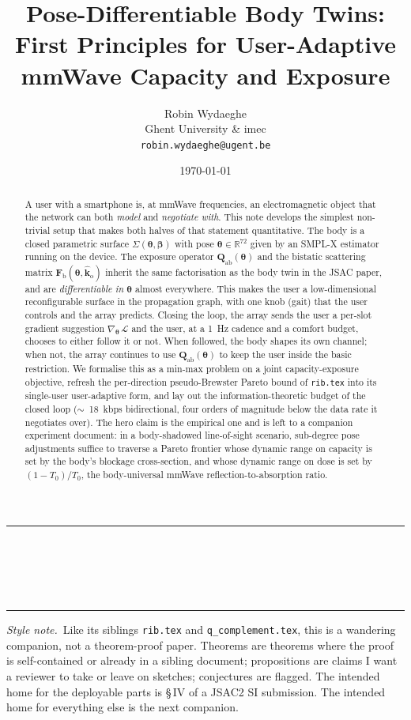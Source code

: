 \documentclass[11pt,a4paper]{article}
\title{\textbf{Pose-Differentiable Body Twins:\\
First Principles for User-Adaptive\\
mmWave Capacity and Exposure}}
\author{Robin Wydaeghe\\
 Ghent University \& imec\\
 \texttt{robin.wydaeghe@ugent.be}}
\date{\today}
\makeatletter
\theoremstyle{definition}
\newcommand{\Reals}{\mathbb{R}}
\newcommand{\Qabs}{\mathbf{Q}_{\mathrm{ab}}}
\newcommand{\kout}{\hat{\bm{k}}_{\mathrm{o}}}
\newcommand{\Frib}{\mathbf{F}_{\mathrm{b}}}
\newcommand{\thetab}{\bm{\theta}}
\newcommand{\betab}{\bm{\beta}}
\renewcommand{\maketitle}{%
  \thispagestyle{plain}%
  \begin{center}
    \rule{\linewidth}{1pt}\\[0.4em]
    {\LARGE\bfseries \@title}\\[0.5em]
    {\large \@author}\\[0.3em]
    {\small \@date}\\[0.4em]\rule{\linewidth}{1pt}
  \end{center}
  \vspace{0.5em}
}
\makeatother
\begin{document}
\maketitle

\begin{abstract}
A user with a smartphone is, at mmWave frequencies, an electromagnetic
object that the network can both \emph{model} and \emph{negotiate
with}.  This note develops the simplest non-trivial setup that makes
both halves of that statement quantitative.  The body is a closed
parametric surface $\Sigma(\thetab,\betab)$ with pose
$\thetab\in\Reals^{72}$ given by an SMPL-X estimator running on the
device.  The exposure operator $\Qabs(\thetab)$ and the bistatic
scattering matrix $\Frib(\thetab,\kout)$ inherit the same
factorisation as the body twin in the JSAC paper, and are
\emph{differentiable in $\thetab$} almost everywhere.  This makes the
user a low-dimensional reconfigurable surface in the propagation
graph, with one knob (gait) that the user controls and the array
predicts.  Closing the loop, the array sends the user a per-slot
gradient suggestion $\nabla_\thetab\,\mathcal{L}$ and the user, at a
\SI{1}{Hz} cadence and a comfort budget, chooses to either follow it
or not.  When followed, the body shapes its own channel; when not,
the array continues to use $\Qabs(\thetab)$ to keep the user inside
the basic restriction.  We formalise this as a min-max problem on a
joint capacity-exposure objective, refresh the per-direction
pseudo-Brewster Pareto bound of \texttt{rib.tex} into its
single-user user-adaptive form, and lay out the information-theoretic
budget of the closed loop ($\sim$~\SI{18}{kbps} bidirectional, four
orders of magnitude below the data rate it negotiates over).  The
hero claim is the empirical one and is left to a companion experiment
document: in a body-shadowed line-of-sight scenario, sub-degree pose
adjustments suffice to traverse a Pareto frontier whose dynamic range
on capacity is set by the body's blockage cross-section, and whose
dynamic range on dose is set by $(1-T_0)/T_0$, the body-universal
mmWave reflection-to-absorption ratio.
\end{abstract}

\vspace{0.3em}
\noindent\textit{Style note.}~Like its siblings
\texttt{rib.tex} and \texttt{q\_complement.tex}, this is a wandering
companion, not a theorem-proof paper.  Theorems are theorems where
the proof is self-contained or already in a sibling document;
propositions are claims I want a reviewer to take or leave on
sketches; conjectures are flagged.  The intended home for the
deployable parts is \S\,IV of a JSAC2 SI submission.  The intended
home for everything else is the next companion.
\end{document}
